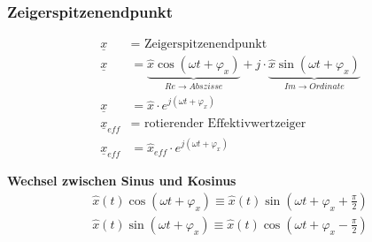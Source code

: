\subsubsection{Zeigerspitzenendpunkt}
\begin{align*}
\underline{x} &= \text{ Zeigerspitzenendpunkt}\\
\underline{x} &= \underbrace{\hat{x}\cos\left(\omega t + \varphi_{x}\right)}_{Re \rightarrow Abszisse} + j \cdot
\underbrace{\hat{x}\sin\left(\omega t + \varphi_{x}\right)}_{Im \rightarrow Ordinate} \\
\underline{x} &= \hat{x} \cdot e^{j \left( \omega t + \varphi_x \right)} \\
\underline{x}_{eff} &= \text{ rotierender Effektivwertzeiger} \\
\underline{x}_{eff} &= \hat{x}_{eff} \cdot e^{j \left( \omega t + \varphi_x \right)} 
\end{align*}

\textbf{Wechsel zwischen Sinus und Kosinus}
\begin{align*}
\hat{x}\left(t\right)\cos\left(\omega t + \varphi_x\right) \equiv \hat{x}\left(t\right)\sin\left(\omega t + \varphi_x + \frac{\pi}{2}\right) \\
\hat{x}\left(t\right)\sin\left(\omega t + \varphi_x\right) \equiv \hat{x}\left(t\right)\cos\left(\omega t + \varphi_x - \frac{\pi}{2}\right)
\end{align*}

